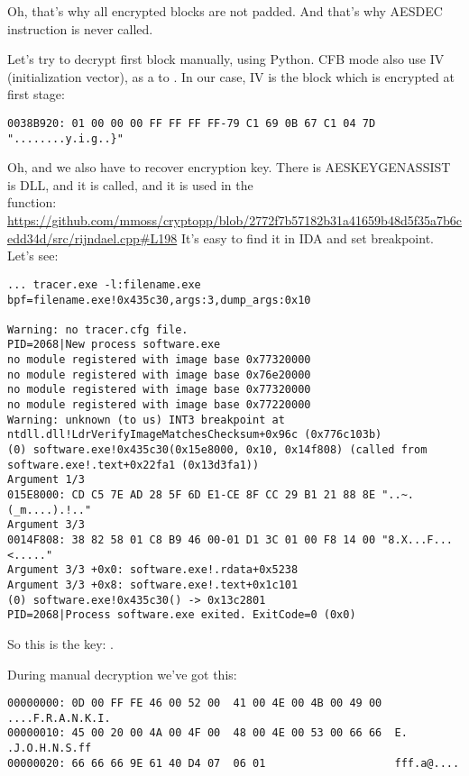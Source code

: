Oh, that's why all encrypted blocks are not padded.
And that's why AESDEC instruction is never called.

Let's try to decrypt first block manually, using Python.
CFB mode also use IV (initialization vector), as a  to .
In our case, IV is the block which is encrypted at first stage:

\begin{lstlisting}
0038B920: 01 00 00 00 FF FF FF FF-79 C1 69 0B 67 C1 04 7D "........y.i.g..}"
\end{lstlisting}

Oh, and we also have to recover encryption key.
There is AESKEYGENASSIST is DLL, and it is called, and it is used in the \\
 function:\\
\url{https://github.com/mmoss/cryptopp/blob/2772f7b57182b31a41659b48d5f35a7b6cedd34d/src/rijndael.cpp#L198}
It's easy to find it in IDA and set breakpoint. Let's see:

\begin{lstlisting}
... tracer.exe -l:filename.exe bpf=filename.exe!0x435c30,args:3,dump_args:0x10

Warning: no tracer.cfg file.
PID=2068|New process software.exe
no module registered with image base 0x77320000
no module registered with image base 0x76e20000
no module registered with image base 0x77320000
no module registered with image base 0x77220000
Warning: unknown (to us) INT3 breakpoint at ntdll.dll!LdrVerifyImageMatchesChecksum+0x96c (0x776c103b)
(0) software.exe!0x435c30(0x15e8000, 0x10, 0x14f808) (called from software.exe!.text+0x22fa1 (0x13d3fa1))
Argument 1/3 
015E8000: CD C5 7E AD 28 5F 6D E1-CE 8F CC 29 B1 21 88 8E "..~.(_m....).!.."
Argument 3/3 
0014F808: 38 82 58 01 C8 B9 46 00-01 D1 3C 01 00 F8 14 00 "8.X...F...<....."
Argument 3/3 +0x0: software.exe!.rdata+0x5238
Argument 3/3 +0x8: software.exe!.text+0x1c101
(0) software.exe!0x435c30() -> 0x13c2801
PID=2068|Process software.exe exited. ExitCode=0 (0x0)
\end{lstlisting}

So this is the key: .

During manual decryption we've got this:

\begin{lstlisting}
00000000: 0D 00 FF FE 46 00 52 00  41 00 4E 00 4B 00 49 00  ....F.R.A.N.K.I.
00000010: 45 00 20 00 4A 00 4F 00  48 00 4E 00 53 00 66 66  E. .J.O.H.N.S.ff
00000020: 66 66 66 9E 61 40 D4 07  06 01                    fff.a@....
\end{lstlisting}

